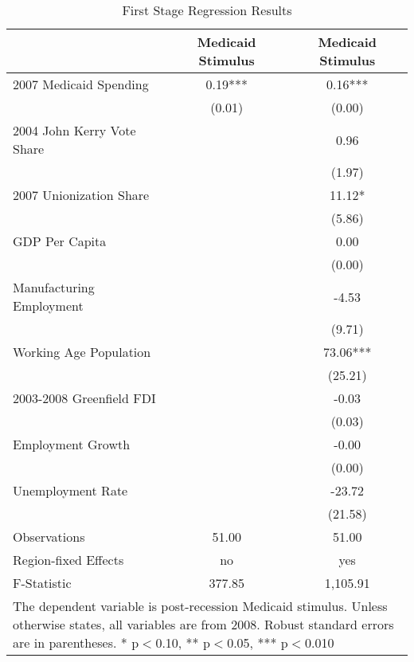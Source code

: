 \begin{table}[!htbp]\centering
\def\sym#1{\ifmmode^{#1}\else\(^{#1}\)\fi}
\caption{First Stage Regression Results}
\begin{tabular}{l*{2}{c}}
\hline\hline
                    &Medicaid Stimulus   &Medicaid Stimulus   \\
\hline
2007 Medicaid Spending&        0.19***&        0.16***\\
                    &      (0.01)   &      (0.00)   \\
2004 John Kerry Vote Share&               &        0.96   \\
                    &               &      (1.97)   \\
2007 Unionization Share&               &       11.12*  \\
                    &               &      (5.86)   \\
GDP Per Capita      &               &        0.00   \\
                    &               &      (0.00)   \\
Manufacturing Employment&               &       -4.53   \\
                    &               &      (9.71)   \\
Working Age Population&               &       73.06***\\
                    &               &     (25.21)   \\
2003-2008 Greenfield FDI&               &       -0.03   \\
                    &               &      (0.03)   \\
Employment Growth   &               &       -0.00   \\
                    &               &      (0.00)   \\
Unemployment Rate   &               &      -23.72   \\
                    &               &     (21.58)   \\
\hline
Observations        &       51.00   &       51.00   \\
Region-fixed Effects&          no   &         yes   \\
F-Statistic         &      377.85   &    1,105.91   \\
\hline\hline
\multicolumn{3}{p{\linewidth}}{\footnotesize The dependent variable is post-recession Medicaid stimulus. Unless otherwise states, all variables are from 2008. Robust standard errors are in parentheses. * p$<$0.10, ** p$<$0.05, *** p$<$0.010}\\
\end{tabular}
\end{table}
